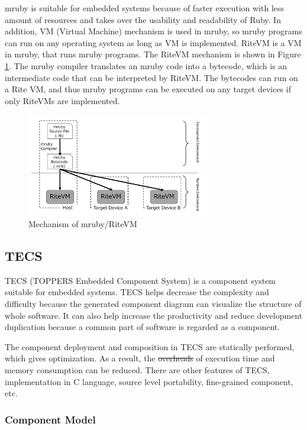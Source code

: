 \documentclass[conference,compsoc]{IEEEtran}
\providecommand{\DIFadd}[1]{{\protect\color{blue}\uwave{#1}}} %
\providecommand{\DIFdel}[1]{{\protect\color{red}\sout{#1}}}                      %
\providecommand{\DIFaddbegin}{} %
\providecommand{\DIFaddend}{} %
\providecommand{\DIFdelbegin}{} %
\providecommand{\DIFdelend}{} %
\begin{document}
mruby is suitable for embedded systems because of faster execution with less amount of resources and takes over the usability and readability of Ruby.
In addition, VM (Virtual Machine) mechanism is used in mruby, so mruby programs can run on any operating system as long as VM is implemented.
RiteVM is a VM in mruby, that runs mruby programs.
The RiteVM mechanism is shown in Figure \ref{fig:mruby}.
The mruby compiler translates an mruby code into a bytecode, which is an intermediate code that can be interpreted by RiteVM.
The bytecodes can run on a Rite VM, and thus mruby programs can be executed on any target devices if only RiteVMs are implemented.
\begin{figure}[t]
    \centering
    \includegraphics[width=8cm,clip]{figure/mruby.pdf}
    \caption{Mechanism of mruby/RiteVM}
    \label{fig:mruby}
\end{figure}

\subsection{TECS}
\label{sec:TECS}
TECS (TOPPERS Embedded Component System) is a component system suitable for embedded systems.
TECS helps decrease the complexity and difficulty because the generated component diagram can visualize the structure of whole software.
It can also help increase the productivity and reduce development duplication  because a common part of software is regarded as a component.

The component deployment and composition in TECS are statically performed, which gives optimization.
As a result, the \DIFdelbegin \DIFdel{overheads }\DIFdelend \DIFaddbegin \DIFadd{overhead }\DIFaddend of execution time and memory consumption can be reduced.
There are other features of TECS, implementation in C language, source level portability, fine-grained component, etc.

\subsubsection{Component Model}\mbox{}\\
\end{document}
